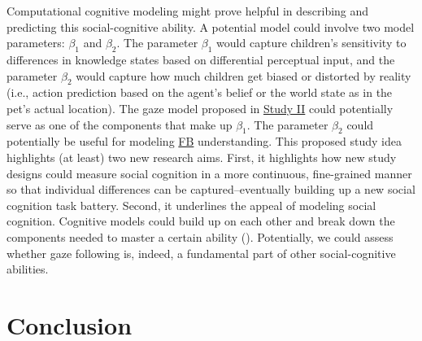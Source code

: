 \documentclass[
]{scrbook}
\begin{document}
Computational cognitive modeling might prove helpful in describing and predicting this social-cognitive ability. A potential model could involve two model parameters: \(\beta_1\) and \(\beta_2\). The parameter \(\beta_1\) would capture children's sensitivity to differences in knowledge states based on differential perceptual input, and the parameter \(\beta_2\) would capture how much children get biased or distorted by reality (i.e., action prediction based on the agent's belief or the world state as in the pet's actual location). The gaze model proposed in \hyperref[studyII]{Study II} could potentially serve as one of the components that make up \(\beta_1\). The parameter \(\beta_2\) could potentially be useful for modeling \hyperref[acronyms_FB]{FB} understanding. This proposed study idea highlights (at least) two new research aims. First, it highlights how new study designs could measure social cognition in a more continuous, fine-grained manner so that individual differences can be captured\thinspace --\thinspace eventually building up a new social cognition task battery. Second, it underlines the appeal of modeling social cognition. Cognitive models could build up on each other and break down the components needed to master a certain ability (). Potentially, we could assess whether gaze following is, indeed, a fundamental part of other social-cognitive abilities.

\chapter{Conclusion}\label{conclusion}
\end{document}
